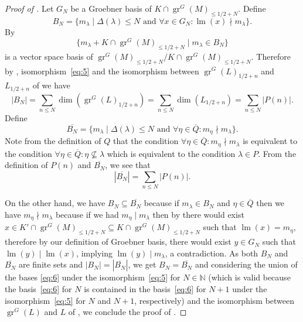 \documentclass[12pt, a4paper]{article}
\DeclareMathOperator{\gr}{gr}
\DeclareMathOperator{\lm}{lm}
\begin{document}
\begin{proof}[Proof of ]
  Let $G_N$ be a Groebner basis of $K \cap \gr^G(M)_{\le 1/2 + N}$.
  Define
  \begin{equation*}
    B_N = \{m_\lambda \mid \Delta(\lambda) \le N\text{ and }\forall x \in G_N: \lm(x) \nmid m_\lambda\}.
  \end{equation*}
  By  
  \begin{equation}
    \label{eq:6}
    \{m_\lambda + K \cap \gr^G(M)_{\le 1/2 + N} \mid m_\lambda \in B_N\}
  \end{equation}
  is a vector space basis of $\gr^G(M)_{\le 1/2 + N}/K \cap \gr^G(M)_{\le 1/2 + N}$.
  Therefore by , isomorphism~\eqref{eq:5} and the isomorphism between $\gr^G(L)_{1/2 + n}$ and $L_{1/2 + n}$ of  we have
  \begin{equation*}
    |B_N| = \sum_{n \le N}\dim(\gr^G(L)_{1/2 + n}) = \sum_{n \le N}\dim(L_{1/2 + n}) = \sum_{n \le N}|P(n)|.
  \end{equation*}
  Define
  \begin{equation*}
    \overline{B_N} = \{m_\lambda \mid \Delta(\lambda) \le N\text{ and }\forall \eta \in \overline{Q}: m_\eta \nmid m_\lambda\}.
  \end{equation*}
  Note from the definition of $Q$ that the condition $\forall \eta\in \overline{Q}: m_\eta \nmid m_\lambda$ is equivalent to the condition $\forall \eta \in \overline{Q}: \eta \nsubseteq \lambda$ which is equivalent to the condition $\lambda \in P$.
  From the definition of $P(n)$ and $\overline{B_N}$, we see that
  \begin{equation*}
    |\overline{B_N}| = \sum_{n \le N}|P(n)|.
  \end{equation*}
  
  On the other hand, we have $B_N \subseteq \overline{B_N}$ because if $m_\lambda \in B_N$ and $\eta \in \overline{Q}$ then we have $m_\eta \nmid m_\lambda$ because if we had $m_\eta \mid m_\lambda$ then by  there would exist $x \in K' \cap \gr^G(M)_{\le 1/2 + N} \subseteq K \cap \gr^G(M)_{\le 1/2 + N}$ such that $\lm(x) = m_\eta$, therefore by our definition of Groebner basis, there would exist $y \in G_N$ such that $\lm(y) \mid \lm(x)$, implying $\lm(y) \mid m_\lambda$, a contradiction.
  As both $B_N$ and $\overline{B_N}$ are finite sets and $|B_N| = |\overline{B_N}|$, we get $B_N = \overline{B_N}$ and considering the union of the bases \eqref{eq:6} under the isomorphism~\eqref{eq:5} for $N \in \mathbb{N}$ (which is valid because the basis~\eqref{eq:6} for $N$ is contained in the basis~\eqref{eq:6} for $N + 1$ under the isomorphism~\eqref{eq:5} for $N$ and $N + 1$, respectively) and the isomorphism between $\gr^G(L)$ and $L$ of , we conclude the proof of .
\end{proof}
\end{document}
